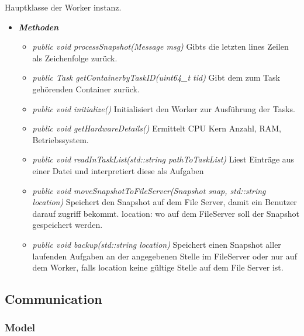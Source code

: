 \documentclass[a4paper,12pt]{article}
\begin{document}
Hauptklasse der Worker instanz.

\begin{itemize}[label={}]

	\item\textit{\textbf{Methoden}}
		\begin{itemize}[label={\textbullet}]
			\item\textit{public void processSnapshot(Message msg)} Gibts die letzten lines Zeilen als Zeichenfolge zurück.
			\item\textit{public Task getContainerbyTaskID(uint64\_t tid)} Gibt dem zum Task gehörenden Container zurück.
			\item\textit{public void initialize()} Initialisiert den Worker zur Ausführung der Tasks.
			\item\textit{public void getHardwareDetails()} Ermittelt CPU Kern Anzahl, RAM, Betriebssystem.
			\item\textit{public void readInTaskList(std::string pathToTaskList)} Liest Einträge aus einer Datei und interpretiert diese als Aufgaben
			\item\textit{public void moveSnapshotToFileServer(Snapshot snap, std::string location)} Speichert den Snapshot auf dem File Server, damit ein Benutzer darauf zugriff bekommt. location: wo auf dem FileServer soll der Snapshot gespeichert werden.
			\item\textit{public void backup(std::string location)} Speichert einen Snapshot aller laufenden Aufgaben an der angegebenen Stelle im FileServer oder nur auf dem Worker, falls location keine gültige Stelle auf dem File Server ist.
			
		\end{itemize}

\end{itemize}

\clearpage


\subsection{Communication}

\subsubsection{Model}
\end{document}

